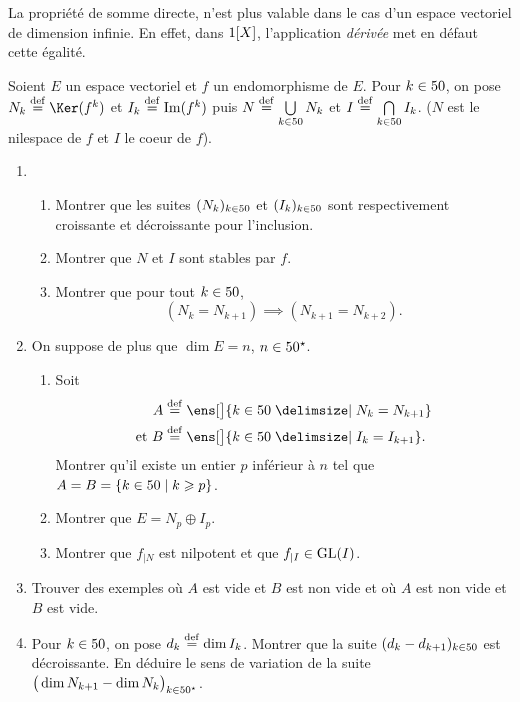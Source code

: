 \begin{remarque}
    La propriété de somme directe, n'est plus valable dans le cas d'un espace vectoriel de dimension infinie. En effet, dans $1[X]$, l'application \emph{dérivée} met en défaut cette égalité. 
\end{remarque}

\begin{exercice}
    Soient $E$ un espace vectoriel et $f$ un endomorphisme de $E$. Pour $k \in 50$, on pose $N_k \defeq \Ker(f^k)$ et $I_k \overset{\mathrm{\tiny def}}{=} \Im(f^k)$ puis $N \overset{\mathrm{\tiny def}}{=} \bigcup\limits_{k \in 50} N_k$ et $I \overset{\mathrm{\tiny def}}{=} \bigcap\limits_{k \in 50} I_k$. ($N$ est le nilespace de $f$ et $I$ le coeur de $f$).
    \begin{enumerate}
        \item 
        \begin{enumerate}
            \item Montrer que les suites $(N_k)_{k \in 50}$ et $(I_k)_{k \in 50}$ sont respectivement croissante et décroissante pour l'inclusion.
            \item Montrer que $N$ et $I$ sont stables par $f$. 
            \item Montrer que pour tout $k \in 50$, 
            $$(N_k = N_{k+1}) \implies (N_{k+1} = N_{k+2}).$$
        \end{enumerate}
        \item On suppose de plus que $\dim E = n$, $n \in 50^\star$.
        \begin{enumerate}
            \item Soit 
            \begin{align*}
                A &\defeq \ens[\big]{ k \in \N \tq N_k = N_{k+1} } \\
                \text{et } B &\defeq \ens[\big]{k \in \N \tq I_k = I_{k+1}}.
            \end{align*}
            Montrer qu'il existe un entier $p$ inférieur à $n$ tel que $A = B =  \{ k \in 50 \mid k \geqslant p \}$.
            \item Montrer que $E = N_p \oplus I_p$.
            \item Montrer que $f_{\vert N}$ est nilpotent et que $f_{\vert I} \in \mathrm{GL}(I)$.
        \end{enumerate}
        \item Trouver des exemples où $A$ est vide et $B$ est non vide et où $A$ est non vide et $B$ est vide.
        \item Pour $k \in 50$, on pose $d_k \overset{\mathrm{\tiny def}}{=} \dim I_k$. Montrer que la suite $(d_k - d_{k+1})_{k \in 50}$ est décroissante. En déduire le sens de variation de la suite $\big( \dim N_{k+1} - \dim N_k \big)_{k \in 50^\star}$.
    \end{enumerate}
\end{exercice}
